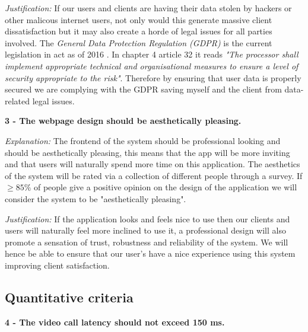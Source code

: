\vspace{0.1cm}

\textit{Justification:}
If our users and clients are having their data stolen by
hackers or other malicous internet users, not only would this 
generate massive client dissatisfaction but it may also create
a horde of legal issues for all parties involved. The 
\textit{General Data Protection Regulation (GDPR)} is the
current legislation in act as of 2016 \cite{gdpr}. In chapter 4 
article 32 it reads \textit{"The processor shall implement
appropriate technical and organisational measures to ensure
a level of security appropriate to the risk"}. Therefore by 
ensuring that user data is properly secured we are complying 
with the GDPR saving myself and the client from data-related
legal issues.

\vspace{0.2cm}

\textsf{\bfseries 3 - The webpage design should be aesthetically
pleasing.}

\vspace{0.1cm}

\textit{Explanation:} 
The frontend of the system should be professional looking and
should be aesthetically pleasing, this means that the app
will be more inviting and that users will naturally spend more
time on this application. The aesthetics of the system will be
rated via a collection of different people through a survey.
If $\geq 85\%$ of people give a positive opinion on the 
design of the application we will consider the system to be 
"aesthetically pleasing".

\vspace{0.1cm}

\textit{Justification:}
If the application looks and feels nice to use then our 
clients and users will naturally feel more inclined to use it,
a professional design will also promote a sensation of trust,
robustness and reliability of the system. We will hence be
able to ensure that our user's have a nice experience using 
this system improving client satisfaction.

\vspace{0.2cm}

\subsection{Quantitative criteria}

\textsf{\bfseries 4 - The video call latency should not exceed 150 ms.}

